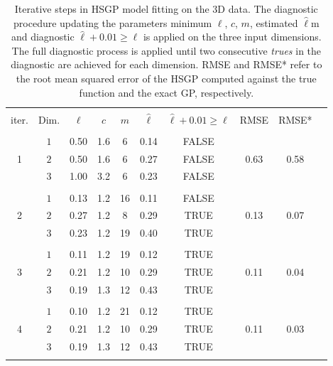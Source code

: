 \begin{table}
\centering
\setlength{\tabcolsep}{3.6pt}
\begin{tabular}{cccccccccc}
\arrayrulecolor{gray}\hline \\[-3mm]
 iter. & Dim. & $\ell$ & $c$ & $m$ & $\hat{\ell}$ & $\hat{\ell} + 0.01 \geq \ell$ & RMSE & RMSE* \\ 
\arrayrulecolor{lightgray}\hline \\[-2mm]
 \multirow{3}{*}{ 1 } & $1$ & 0.50 & 1.6 & 6 & 0.14 & FALSE & \multirow{3}{*}{ 0.63 } & \multirow{3}{*}{ 0.58 }\\ 
 & $2$ & 0.50 & 1.6 & 6 & 0.27 & FALSE &  &  \\
 & $3$ & 1.00 & 3.2 & 6 & 0.23 & FALSE &  &  \\
\arrayrulecolor{lightgray}\hline \\[-2mm]
 \multirow{3}{*}{ 2 } & $1$ & 0.13 & 1.2 & 16 & 0.11 & FALSE  & \multirow{3}{*}{ 0.13 } & \multirow{3}{*}{ 0.07 }\\
 & $2$ & 0.27 & 1.2 & 8 & 0.29 & TRUE &  &  \\
 & $3$ & 0.23 & 1.2 & 19 & 0.40 & TRUE &  &  \\
\arrayrulecolor{lightgray}\hline \\[-2mm]
 \multirow{3}{*}{ 3 } & $1$ & 0.11 & 1.2 & 19 & 0.12 & TRUE  & \multirow{3}{*}{ 0.11 } & \multirow{3}{*}{ 0.04 }\\
 & $2$ & 0.21 & 1.2 & 10 & 0.29 & TRUE &  &  \\
 & $3$ & 0.19 & 1.3 & 12 & 0.43 & TRUE &  &  \\
 \arrayrulecolor{lightgray}\hline \\[-2mm]
 \multirow{3}{*}{ 4 } & $1$ & 0.10 & 1.2 & 21 & 0.12 & TRUE  & \multirow{3}{*}{ 0.11 } & \multirow{3}{*}{ 0.03 }\\
 & $2$ & 0.21 & 1.2 & 10 & 0.29 & TRUE &  &  \\
 & $3$ & 0.19 & 1.3 & 12 & 0.43 & TRUE &  &  \\[1mm] 
\arrayrulecolor{lightgray}\hline
 \multicolumn{9}{l}{{\small Exact GP length-scales:} $\ell_{1_{GP}}=0.11$, \,$\ell_{2_{GP}}=0.32$, \, $\ell_{3_{GP}}=0.43$ }
\end{tabular}
\caption{Iterative steps in HSGP model fitting on the $3$D data. The diagnostic procedure updating the parameters minimum $\ell$, $c$, $m$, estimated $\hat{\ell}$m and diagnostic $\hat{\ell} + 0.01 \geq \ell$ is applied on the three input dimensions. The full diagnostic process is applied until two consecutive \textit{trues} in the diagnostic are achieved for each dimension. RMSE and RMSE* refer to the root mean squared error of the HSGP computed against the true function and the exact GP, respectively.}
  \label{tab_caseIII_3D}
\end{table}

